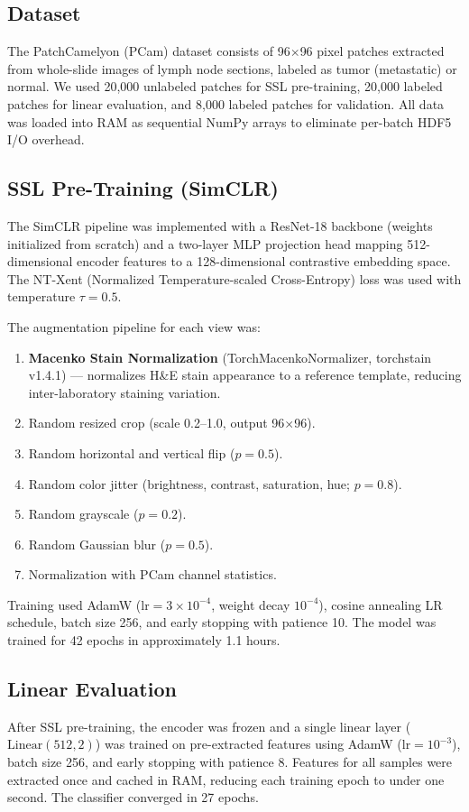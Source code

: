 \documentclass[conference]{IEEEtran}
\begin{document}
\subsection{Dataset}
The PatchCamelyon (PCam) dataset consists of 96$\times$96 pixel patches extracted from whole-slide images of lymph node sections, labeled as tumor (metastatic) or normal. We used 20,000 unlabeled patches for SSL pre-training, 20,000 labeled patches for linear evaluation, and 8,000 labeled patches for validation. All data was loaded into RAM as sequential NumPy arrays to eliminate per-batch HDF5 I/O overhead.

\subsection{SSL Pre-Training (SimCLR)}
The SimCLR pipeline was implemented with a ResNet-18 backbone (weights initialized from scratch) and a two-layer MLP projection head mapping 512-dimensional encoder features to a 128-dimensional contrastive embedding space. The NT-Xent (Normalized Temperature-scaled Cross-Entropy) loss was used with temperature $\tau = 0.5$.

The augmentation pipeline for each view was:
\begin{enumerate}
\item \textbf{Macenko Stain Normalization} (TorchMacenkoNormalizer, torchstain v1.4.1) — normalizes H\&E stain appearance to a reference template, reducing inter-laboratory staining variation.
\item Random resized crop (scale 0.2--1.0, output 96$\times$96).
\item Random horizontal and vertical flip ($p=0.5$).
\item Random color jitter (brightness, contrast, saturation, hue; $p=0.8$).
\item Random grayscale ($p=0.2$).
\item Random Gaussian blur ($p=0.5$).
\item Normalization with PCam channel statistics.
\end{enumerate}

Training used AdamW ($\text{lr}=3\times10^{-4}$, weight decay $10^{-4}$), cosine annealing LR schedule, batch size 256, and early stopping with patience 10. The model was trained for 42 epochs in approximately 1.1 hours.

\subsection{Linear Evaluation}
After SSL pre-training, the encoder was frozen and a single linear layer ($\text{Linear}(512, 2)$) was trained on pre-extracted features using AdamW ($\text{lr}=10^{-3}$), batch size 256, and early stopping with patience 8. Features for all samples were extracted once and cached in RAM, reducing each training epoch to under one second. The classifier converged in 27 epochs.
\end{document}
